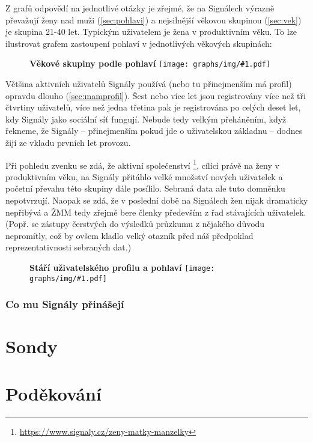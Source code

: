 \documentclass[12pt, a4paper, twoside]{article}
\newcommand{\includegraphonly}[2]{
  \begin{figure}[H]
    \centering
    \textbf{#2}
    \texttt{[image: graphs/img/\#1.pdf]}
  \end{figure}
}
\begin{document}
Z grafů odpovědí na jednotlivé otázky je zřejmé,
že na Signálech výrazně převažují ženy nad muži (\ref{sec:pohlavi})
a nejsilnější věkovou skupinou (\ref{sec:vek}) je skupina
21-40 let. Typickým uživatelem je žena v produktivním věku.
To lze ilustrovat grafem zastoupení pohlaví v jednotlivých
věkových skupinách:

\includegraphonly{vek_x_pohlavi}{Věkové skupiny podle pohlaví}

Většina aktivních uživatelů Signály používá
(nebo tu přinejmenším má profil) opravdu dlouho (\ref{sec:mamprofil}).
Šest nebo více let jsou registrovány více než tři čtvrtiny uživatelů,
více než jedna třetina pak je registrována po celých deset let,
kdy Signály jako sociální síť fungují. Nebude tedy velkým
přeháněním, když řekneme, že Signály -- přinejmenším pokud
jde o uživatelskou základnu -- dodnes žijí ze vkladu prvních let
provozu.

Při pohledu zvenku se zdá, že aktivní společenství
\footnote{
  \url{https://www.signaly.cz/zeny-matky-manzelky}},
cílící právě na ženy v produktivním věku, na Signály přitáhlo
velké množství nových uživatelek a početní převahu této skupiny
dále posílilo. Sebraná data ale tuto domněnku nepotvrzují.
Naopak se zdá, že v poslední době na Signálech žen nijak
dramaticky nepřibývá a ŽMM tedy zřejmě bere členky především
z řad stávajících uživatelek.
(Popř. se zástupy čerstvých  do výsledků
průzkumu z nějakého důvodu nepromítly, což by ovšem kladlo
velký otazník před náš předpoklad reprezentativnosti sebraných dat.)

\includegraphonly{profil_x_pohlavi}{Stáří uživatelského profilu a pohlaví}

\subsubsection{Co mu Signály přinášejí}

\subsection{}

\section{Sondy}

\section*{Poděkování}
\end{document}
